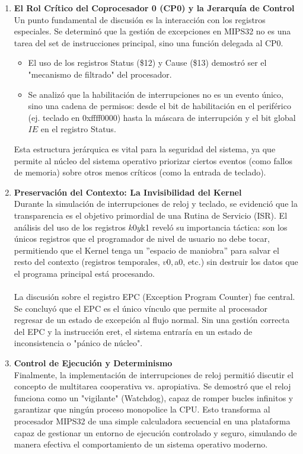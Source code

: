 \documentclass[]{article}
\begin{document}
\begin{enumerate}
		\item \textbf{El Rol Crítico del Coprocesador 0 (CP0) y la Jerarquía de Control}\\
			Un punto fundamental de discusión es la interacción con los registros especiales. Se determinó que la gestión de excepciones en MIPS32 no es una tarea del set de instrucciones principal, sino una función delegada al CP0.
			\begin{itemize}
				\item El uso de los registros Status (\$12) y Cause (\$13) demostró ser el "mecanismo de filtrado" del procesador.
				\item Se analizó que la habilitación de interrupciones no es un evento único, sino una cadena de permisos: desde el bit de habilitación en el periférico (ej. teclado en 0xffff0000) hasta la máscara de interrupción y el bit global $IE$ en el registro Status.
			\end{itemize}
			Esta estructura jerárquica es vital para la seguridad del sistema, ya que permite al núcleo del sistema operativo priorizar ciertos eventos (como fallos de memoria) sobre otros menos críticos (como la entrada de teclado).
		\item \textbf{Preservación del Contexto: La Invisibilidad del Kernel}\\
			Durante la simulación de interrupciones de reloj y teclado, se evidenció que la transparencia es el objetivo primordial de una Rutina de Servicio (ISR). El análisis del uso de los registros $k0 y $k1 reveló su importancia táctica: son los únicos registros que el programador de nivel de usuario no debe tocar, permitiendo que el Kernel tenga un ''espacio de maniobra'' para salvar el resto del contexto (registros temporales, $v0, $a0, etc.) sin destruir los datos que el programa principal está procesando.
			\\\\
			La discusión sobre el registro EPC (Exception Program Counter) fue central. Se concluyó que el EPC es el único vínculo que permite al procesador regresar de un estado de excepción al flujo normal. Sin una gestión correcta del EPC y la instrucción eret, el sistema entraría en un estado de inconsistencia o "pánico de núcleo".
			
		\item \textbf{Control de Ejecución y Determinismo}\\
			Finalmente, la implementación de interrupciones de reloj permitió discutir el concepto de multitarea cooperativa vs. apropiativa. Se demostró que el reloj funciona como un "vigilante" (Watchdog), capaz de romper bucles infinitos y garantizar que ningún proceso monopolice la CPU. Esto transforma al procesador MIPS32 de una simple calculadora secuencial en una plataforma capaz de gestionar un entorno de ejecución controlado y seguro, simulando de manera efectiva el comportamiento de un sistema operativo moderno.
	\end{enumerate}
\end{document}

